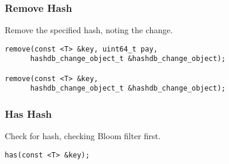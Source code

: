 \documentclass[12pt,twoside]{article}
\newcommand{\mmi}{\textbf{multimap iterator}\xspace}
\begin{document}
\subsubsection{Remove Hash}
Remove the specified hash, noting the change.

\begin{small}
\begin{verbatim}
remove(const <T> &key, uint64_t pay,
      hashdb_change_object_t &hashdb_change_object);

remove(const <T> &key,
      hashdb_change_object_t &hashdb_change_object);
\end{verbatim}
\end{small}

\subsubsection{Has Hash}
Check for hash, checking Bloom filter first.

\begin{small}
\begin{verbatim}
has(const <T> &key);
\end{verbatim}
\end{small}

%

%
\end{document}
